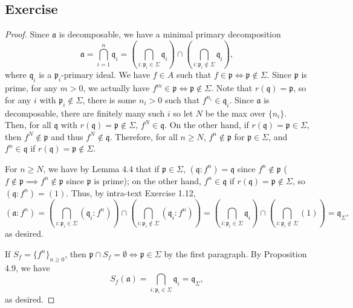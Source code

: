 \subsection{Exercise}\label{4.15}

\begin{proof}
Since $\mathfrak{a}$ is decomposable, we have a minimal primary decomposition
$$\mathfrak{a} = \bigcap_{i=1}^n \mathfrak{q}_i = \left(\bigcap_{i:\mathfrak{p}_i \in \Sigma} \mathfrak{q}_i\right)\cap\left(\bigcap_{i:\mathfrak{p}_i \not\in \Sigma} \mathfrak{q}_i\right),$$
where $\mathfrak{q}_i$ is a $\mathfrak{p}_i$-primary ideal. We have $f \in A$ such that $f \in \mathfrak{p} \iff \mathfrak{p} \not\in \Sigma$. Since $\mathfrak{p}$ is prime, for any $m > 0$, we
actually have $f^m \in \mathfrak{p} \iff \mathfrak{p} \not\in \Sigma$. Note that $r(\mathfrak{q}) = \mathfrak{p}$, so for any $i$ with $\mathfrak{p}_i \not\in \Sigma$, there is some $n_i > 0$ such 
that $f^{n_i} \in \mathfrak{q}_i$. Since $\mathfrak{a}$ is decomposable, there are finitely many such $i$ so let $N$ be the max over $\{n_i\}$. Then, for all $\mathfrak{q}$ with 
$r(\mathfrak{q}) = \mathfrak{p} \not\in \Sigma$, $f^N \in \mathfrak{q}$. On the other hand, if $r(\mathfrak{q}) = \mathfrak{p} \in \Sigma$, then $f^N \not\in \mathfrak{p}$ and thus
$f^N \not\in \mathfrak{q}$. Therefore, for all $n \ge N$, $f^n \not\in \mathfrak{p}$ for $\mathfrak{p} \in \Sigma$, and $f^n \in \mathfrak{q}$ if $r(\mathfrak{q}) = \mathfrak{p} \not\in \Sigma$.

For $n \ge N$, we have by Lemma 4.4 that if $\mathfrak{p} \in \Sigma$, $(\mathfrak{q}:f^n) = \mathfrak{q}$ since $f^n \not\in \mathfrak{p}$ ($f \not\in \mathfrak{p} \implies f^n \not\in\mathfrak{p}$ since
$\mathfrak{p}$ is prime); on the other hand, $f^n \in \mathfrak{q}$ if $r(\mathfrak{q}) = \mathfrak{p} \not\in \Sigma$, so $(\mathfrak{q}:f^n) = (1)$. Thus, by intra-text Exercise 1.12,
$$(\mathfrak{a}:f^n) = \left(\bigcap_{i:\mathfrak{p}_i \in \Sigma} (\mathfrak{q}_i:f^n)\right)\cap\left(\bigcap_{i:\mathfrak{p}_i \not\in \Sigma} (\mathfrak{q}_i:f^n)\right)
= \left(\bigcap_{i:\mathfrak{p}_i \in \Sigma}\mathfrak{q}_i\right)\cap\left(\bigcap_{i:\mathfrak{p}_i \not\in \Sigma}(1)\right) = \mathfrak{q}_{\Sigma},$$
as desired.

If $S_f = \{f^n\}_{n \ge 0}$, then $\mathfrak{p} \cap S_f = \emptyset \iff \mathfrak{p} \in \Sigma$ by the first paragraph. By Proposition 4.9, we have
$$S_f(\mathfrak{a}) = \bigcap_{i:\mathfrak{p}_i \in \Sigma}\mathfrak{q}_i = \mathfrak{q}_{\Sigma},$$
as desired.
\end{proof}


